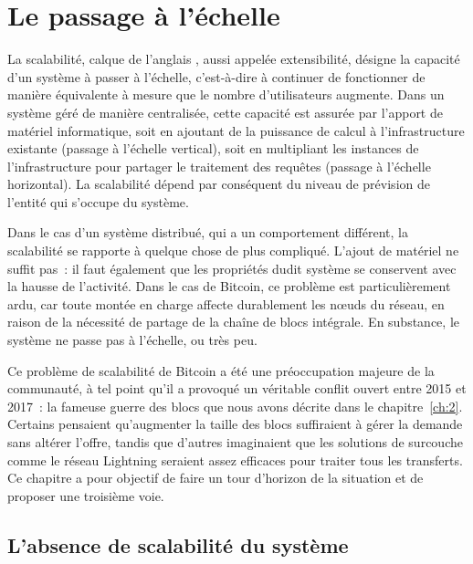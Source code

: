 
\chapter{Le passage à l'échelle}
\label{ch:14}

La scalabilité, calque de l'anglais , aussi appelée extensibilité, désigne la capacité d'un système à passer à l'échelle, c'est-à-dire à continuer de fonctionner de manière équivalente à mesure que le nombre d'utilisateurs augmente. Dans un système géré de manière centralisée, cette capacité est assurée par l'apport de matériel informatique, soit en ajoutant de la puissance de calcul à l'infrastructure existante (passage à l'échelle vertical), soit en multipliant les instances de l'infrastructure pour partager le traitement des requêtes (passage à l'échelle horizontal). La scalabilité dépend par conséquent du niveau de prévision de l'entité qui s'occupe du système.

Dans le cas d'un système distribué, qui a un comportement différent, la scalabilité se rapporte à quelque chose de plus compliqué. L'ajout de matériel ne suffit pas~: il faut également que les propriétés dudit système se conservent avec la hausse de l'activité. Dans le cas de Bitcoin, ce problème est particulièrement ardu, car toute montée en charge affecte durablement les nœuds du réseau, en raison de la nécessité de partage de la chaîne de blocs intégrale. En substance, le système ne passe pas à l'échelle, ou très peu.

Ce problème de scalabilité de Bitcoin a été une préoccupation majeure de la communauté, à tel point qu'il a provoqué un véritable conflit ouvert entre 2015 et 2017~: la fameuse guerre des blocs que nous avons décrite dans le chapitre~\ref{ch:2}. Certains pensaient qu'augmenter la taille des blocs suffiraient à gérer la demande sans altérer l'offre, tandis que d'autres imaginaient que les solutions de surcouche comme le réseau Lightning seraient assez efficaces pour traiter tous les transferts. Ce chapitre a pour objectif de faire un tour d'horizon de la situation et de proposer une troisième voie.

\section*{L'absence de scalabilité du système} %

